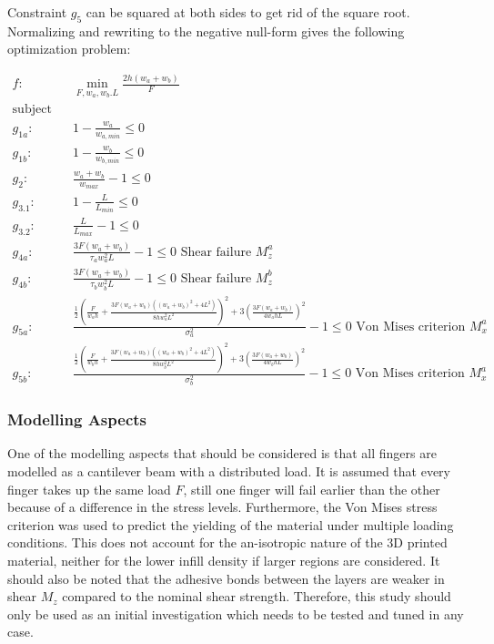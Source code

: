 Constraint $g_5$ can be squared at both sides to get rid of the square root. Normalizing and rewriting to the negative null-form gives the following optimization problem:

\begin{align*}
	f: & \min_{F, {w_a}, {w_b}. L}  \frac{2h \left(w_a + w_b\right)}{F} \nonumber \\
	\text{subject to:} & \nonumber \\
	g_{1a}:& 1 - \frac{w_a}{w_{a,min}}  \le 0 \\
	g_{1b}:& 1 - \frac{w_b}{w_{b,min}}  \le 0 \\
	g_2:& \frac{w_a + w_b}{w_{max}}  - 1 \le 0 \\
	g_{3.1}:& 1 - \frac{L}{L_{min}} \le 0 \\
	g_{3.2}:&\frac{L}{L_{max}} - 1  \le 0 \\
	g_{4a}: & \frac{ 3 F \left(w_a + w_b \right) }{ \tau_a w_a ^2 L} - 1 \le 0					\text{ Shear failure } M_z^a \\
	g_{4b}: & \frac{ 3 F \left(w_a + w_b \right) }{ \tau_b w_b ^2 L} - 1 \le 0					\text{ Shear failure } M_z^b \\
	g_{5a}:& \frac{\frac{1}{2} \left( \frac{F}{w_a  h} + 	\frac{ 3 F \left(w_a + w_b \right) \left(\left(w_a + w_b \right) ^2 + 4L^2 \right)  }{ 8h w_a^2 L^2 }   \right)^2+ 3\left(	\frac{ 3 F \left(w_a + w_b \right) }{ 4  w_a h L}  \right) ^2	} { \sigma_a^2} - 1	\le 0	\text{ Von Mises criterion } M_x^a \\
	g_{5b}:& \frac{\frac{1}{2} \left( \frac{F}{w_b  h} + 	\frac{ 3 F \left(w_a + w_b \right) \left(\left(w_a + w_b \right) ^2 + 4L^2 \right)  }{ 8h w_b^2 L^2 }   \right)^2+ 3\left(	\frac{ 3 F \left(w_a + w_b \right) }{ 4  w_b h L}  \right) ^2	} { \sigma_b^2} - 1	\le 0	\text{ Von Mises criterion } M_x^a 
\end{align*}



\subsubsection{Modelling Aspects}
One of the modelling aspects that should be considered is that all fingers are modelled as a cantilever beam with a distributed load. It is assumed that every finger takes up the same load $F$, still one finger will fail earlier than the other because of a difference in the stress levels. Furthermore, the Von Mises stress criterion was used to predict the yielding of the material under multiple loading conditions. This does not account for the an-isotropic nature of the 3D printed material, neither for the lower infill density if larger regions are considered. It should also be noted that the adhesive bonds between the layers are weaker in shear $M_z$ compared to the nominal shear strength. Therefore, this study should only be used as an initial investigation which needs to be tested and tuned in any case.

